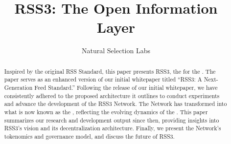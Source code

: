 \documentclass[conference]{IEEEtran}
\begin{document}
\title{RSS3: The Open Information Layer}

\author{Natural Selection Labs}
\maketitle

\tableofcontents

\thispagestyle{plain}
\pagestyle{plain}

\begin{abstract}

    Inspired by the original RSS Standard, this paper presents RSS3, the  for the . The paper serves as an enhanced version of our initial whitepaper titled ``RSS3: A Next-Generation Feed Standard.'' Following the release of our initial whitepaper, we have consistently adhered to the proposed architecture it outlines to conduct experiments and advance the development of the RSS3 Network. The Network has transformed into what is now known as the , reflecting the evolving dynamics of the . This paper summarizes our research and development output since then, providing insights into RSS3's vision and its decentralization architecture. Finally, we present the Network's tokenomics and governance model, and discuss the future of RSS3.

\end{abstract}













\printglossary[title=Glossary, toctitle=Glossary]



\end{document}
